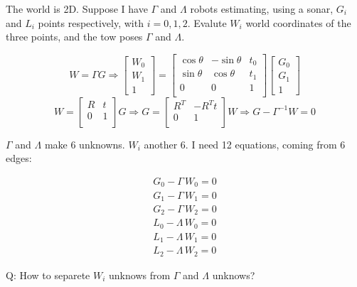 \documentclass[a4]{article}
\begin{document}
The world is 2D.
Suppose I have $\Gamma$ and $\Lambda$ robots estimating, using a sonar,
$G_i$ and $L_i$ points respectively, with $i = {0,1,2}$. Evalute $W_i$ world 
coordinates of the three points, and the tow poses $\Gamma$ and $\Lambda$.

\[
W = \Gamma G \Rightarrow
\left[
\begin{array}{c}
W_0\\
W_1\\
1
\end{array}\right]
=
\left[
\begin{array}{ccc}
\cos{\theta} & -\sin{\theta} & t_0\\
\sin{\theta} & \cos{\theta} & t_1\\
0 & 0 & 1\\
\end{array}\right]
\left[
\begin{array}{c}
G_0\\
G_1\\
1
\end{array}\right]
\]
\[
W = 
\left[
\begin{array}{cc}
R & t\\
0 & 1\\
\end{array}
\right] G
\Rightarrow
G = 
\left[
\begin{array}{cc}
R^T & -R^Tt\\
0 & 1\\
\end{array}
\right] W
\Rightarrow
G - \Gamma^{-1} W = 0
\]

$\Gamma$ and $\Lambda$ make 6 unknowns. $W_i$ another 6. 
I need 12 equations, coming from 6 edges:

\begin{align}
G_0 - \Gamma\, W_0 = 0\nonumber\\
G_1 - \Gamma\, W_1 = 0\nonumber\\
G_2 - \Gamma\, W_2 = 0\nonumber\\
L_0 - \Lambda\, W_0 = 0\nonumber\\
L_1 - \Lambda\, W_1 = 0\nonumber\\
L_2 - \Lambda\, W_2 = 0\nonumber
\end{align}

Q: How to separete $W_i$ unknows from $\Gamma$ and $\Lambda$ unknows?
\end{document}
